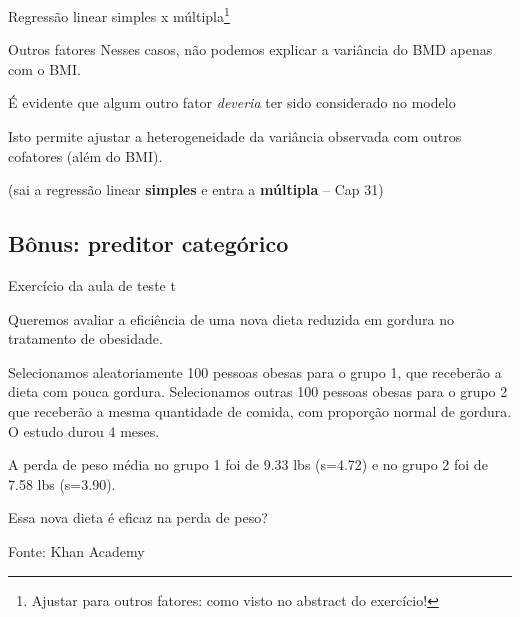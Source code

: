 \documentclass{beamer}
\begin{document}
\begin{frame}{\small Regressão linear simples x múltipla\footnote{Ajustar para outros fatores: como visto no abstract do exercício!}}
  \begin{block}{Outros fatores}
    \small
    Nesses casos, não podemos explicar a variância do BMD apenas com o BMI.

    \bigskip
    É evidente que algum outro fator {\em deveria} ter sido considerado no modelo

    \bigskip
    Isto permite \alert{ajustar} a heterogeneidade da variância observada com outros cofatores (além do BMI).
  \end{block}
  \vfill
  \hfill \footnotesize (sai a regressão linear {\bf simples} e entra a {\bf múltipla} -- Cap 31)
\end{frame}

\subsection{Bônus: preditor categórico}

\begin{frame}{\small Exercício da aula de teste t}
  \begin{exampleblock}{}
    \small
    Queremos avaliar a eficiência de uma nova dieta reduzida em
    gordura no tratamento de obesidade.

    \bigskip
    {\footnotesize
      Selecionamos aleatoriamente 100 pessoas obesas para o grupo 1, que receberão a dieta com pouca gordura.
      Selecionamos outras 100 pessoas obesas para o grupo 2 que receberão a mesma quantidade de comida, com proporção normal de gordura.
      O estudo durou 4 meses.
    }

    \bigskip
    \begin{exampleblock}{}
      \footnotesize
      A perda de peso média no grupo 1 foi de 9.33 lbs
      (s=4.72) e no grupo 2 foi de 7.58 lbs (s=3.90).
    \end{exampleblock}
  \end{exampleblock}
  \begin{block}{}
    Essa nova dieta é eficaz na perda de peso?
  \end{block}
  \hfill {\footnotesize Fonte: Khan Academy}
\end{frame}
\end{document}
